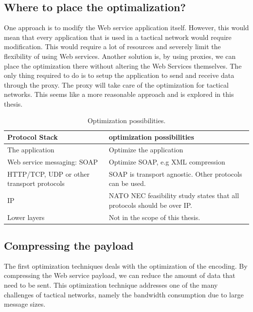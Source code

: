 \documentclass[USenglish]{ifimaster}
\begin{document}
\subsection{Where to place the optimalization?}
One approach is to modify the Web service application itself. However, this
would mean that every application that is used in a tactical network would
require modification. This would require a lot of resources and severely limit
the flexibility of using Web services. Another solution is, by using proxies, we
can place the optimization there without altering the Web Services themselves.
The only thing required to do is to setup the application to send and receive
data through the proxy. The proxy will take care of the optimization for
tactical networks. This seems like a more reasonable approach and is explored in
this thesis.


\begin{table}[h]
\begin{tabularx}{\textwidth}{| X | X |}
\hline
  \textbf{Protocol Stack} & \textbf{optimization possibilities} \\ \hline
  The application & Optimize the application\\ \hline
  Web service messaging: SOAP & Optimize SOAP, e.g XML compression \\ \hline
  HTTP/TCP, UDP or other transport protocols & SOAP is transport agnostic. Other
  protocols can be used. \\ \hline
  IP & NATO NEC feasibility study states that all protocols should be over IP. \\
  \hline
  Lower layers & Not in the scope of this thesis. \\ \hline
\end{tabularx}
\caption{Optimization possibilities.} \label{table:optimalization-overview}
\end{table}


\subsection{Compressing the payload}

The first optimization techniques deals with the optimization of the encoding.
By compressing the Web service payload, we can reduce the amount of data that
need to be sent. This optimization technique addresses one of the many
challenges of tactical networks, namely the bandwidth consumption due to large
message sizes.
\end{document}
